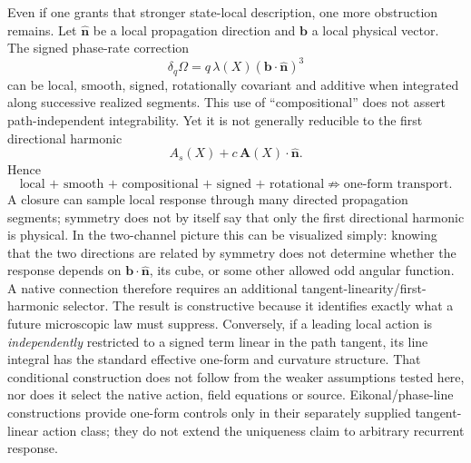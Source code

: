 \documentclass[11pt]{article}
\theoremstyle{definition}
\begin{document}
Even if one grants that stronger state-local description, one more obstruction remains.  Let $\hat{\mathbf n}$ be a local propagation direction and $\mathbf b$ a local physical vector.  The signed phase-rate correction
\begin{equation}
 \delta_q\Omega=q\,\lambda(X)(\mathbf b\cdot\hat{\mathbf n})^3
 \label{eq:cubic_counterexample}
\end{equation}
can be local, smooth, signed, rotationally covariant and additive when integrated along successive realized segments.  This use of ``compositional'' does not assert path-independent integrability.  Yet it is not generally reducible to the first directional harmonic
\begin{equation}
 A_s(X)+c\,\mathbf A(X)\cdot\hat{\mathbf n}.
 \label{eq:one_form_directional}
\end{equation}
Hence
\begin{equation}
\boxed{
\text{local + smooth + compositional + signed + rotational}
\not\Rightarrow
\text{one-form transport}.}
\label{eq:tangent_linearity_negative}
\end{equation}
A closure can sample local response through many directed propagation segments; symmetry does not by itself say that only the first directional harmonic is physical.  In the two-channel picture this can be visualized simply: knowing that the two directions are related by symmetry does not determine whether the response depends on $\mathbf b\!\cdot\!\hat{\mathbf n}$, its cube, or some other allowed odd angular function.  A native connection therefore requires an additional tangent-linearity/first-harmonic selector.  The result is constructive because it identifies exactly what a future microscopic law must suppress.  Conversely, if a leading local action is \emph{independently} restricted to a signed term linear in the path tangent, its line integral has the standard effective one-form and curvature structure.  That conditional construction does not follow from the weaker assumptions tested here, nor does it select the native action, field equations or source.  Eikonal/phase-line constructions provide one-form controls only in their separately supplied tangent-linear action class; they do not extend the uniqueness claim to arbitrary recurrent response.
\end{document}
